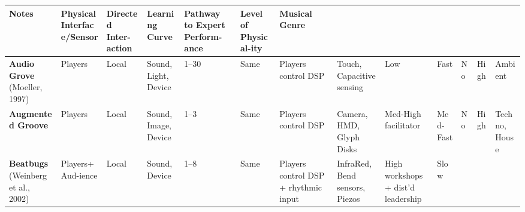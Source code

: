 \begin{center}
\begin{table}[ht]
\begin{tabular}{|p{41pt}|p{22pt}|p{22pt}|p{26pt}|p{17pt}|p{26pt}|p{31pt}|p{35pt}|p{33pt}|p{24pt}|p{35pt}|p{26pt}|p{36pt}|}
{\textbf{{\small Notes}}
} & \parbox{35pt}{\centering 
\textbf{{\small Physical Interface/Sensor}}
} & \parbox{33pt}{\centering 
\textbf{{\small Directed Inter-action}}
} & \parbox{24pt}{\centering 
\textbf{{\small Learning Curve}}
} & \parbox{35pt}{\centering 
\textbf{{\small Pathway to Expert Perform-ance}}
} & \parbox{26pt}{\centering 
\textbf{{\small Level of Physical-ity}}
} & \parbox{36pt}{\centering 
\textbf{{\small Musical Genre}}
} \\
\hline
\parbox{41pt}{\raggedright 
{\small \textbf{Audio Grove} (Moeller, 1997)}
} & \parbox{22pt}{\raggedright 
{\small Players}
} & \parbox{22pt}{\raggedright 
{\small Local}
} & \parbox{26pt}{\raggedright 
{\small Sound, Light, Device}
} & \parbox{17pt}{\raggedright 
{\small 1--30  }
} & \parbox{26pt}{\raggedright 
{\small Same}
} & \parbox{31pt}{\centering 
{\small Players control DSP}
} & \parbox{35pt}{\centering 
{\small Touch, Capacitive sensing}
} & \parbox{33pt}{\centering 
{\small Low}
} & \parbox{24pt}{\centering 
{\small Fast}
} & \parbox{35pt}{\centering 
{\small No}
} & \parbox{26pt}{\centering 
{\small High}
} & \parbox{36pt}{\raggedright 
{\small Ambient}
} \\
\hline
\parbox{41pt}{\raggedright 
{\small \textbf{Augmented Groove} \cite{Poupyrev:2001}}
} & \parbox{22pt}{\raggedright 
{\small Players}
} & \parbox{22pt}{\raggedright 
{\small Local}
} & \parbox{26pt}{\raggedright 
{\small Sound, Image, Device}
} & \parbox{17pt}{\raggedright 
{\small 1--3}
} & \parbox{26pt}{\raggedright 
{\small Same}
} & \parbox{31pt}{\centering 
{\small Players control DSP}
} & \parbox{35pt}{\centering 
{\small Camera, HMD, Glyph Disks}
} & \parbox{33pt}{\centering 
{\small Med-High facilitator}
} & \parbox{24pt}{\centering 
{\small Med-Fast}
} & \parbox{35pt}{\centering 
{\small No}
} & \parbox{26pt}{\centering 
{\small High}
} & \parbox{36pt}{\raggedright 
{\small Techno, House}
} \\
\hline
\parbox{41pt}{\raggedright 
{\small \textbf{Beatbugs }(Weinberg et al., 2002)}
} & \parbox{22pt}{\raggedright 
{\small Players+ Aud-ience}
} & \parbox{22pt}{\raggedright 
{\small Local}
} & \parbox{26pt}{\raggedright 
{\small Sound, Device}
} & \parbox{17pt}{\raggedright 
{\small 1--8}
} & \parbox{26pt}{\raggedright 
{\small Same}
} & \parbox{31pt}{\centering 
{\small Players control DSP + rhythmic input}
} & \parbox{35pt}{\centering 
{\small InfraRed, Bend sensors, Piezos}
} & \parbox{33pt}{\centering 
{\small High workshops+ dist'd leadership}
} & \parbox{24pt}{\centering 
{\small Slow}
} & \parbox{35pt}{\centering 
}
\end{tabular}
\end{table}
\end{center}
